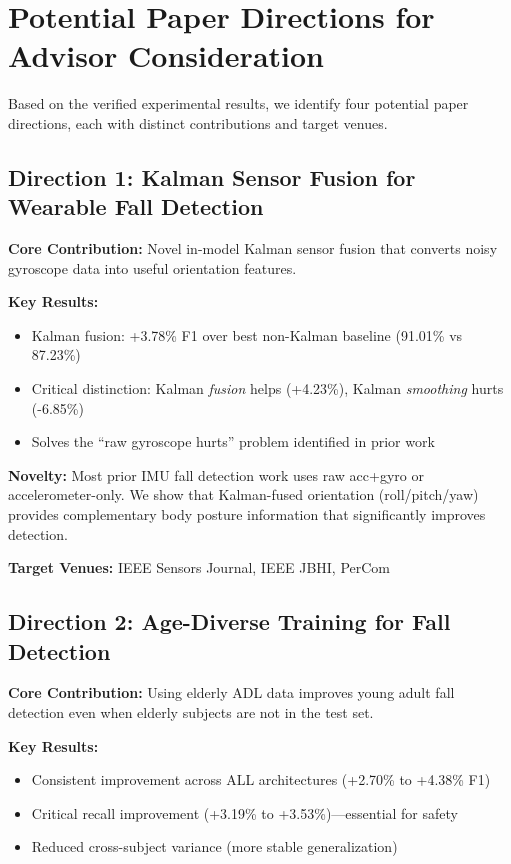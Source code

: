 \documentclass{article}
\begin{document}
\section{Potential Paper Directions for Advisor Consideration}

Based on the verified experimental results, we identify four potential paper directions, each with distinct contributions and target venues.

\subsection{Direction 1: Kalman Sensor Fusion for Wearable Fall Detection}

\textbf{Core Contribution:} Novel in-model Kalman sensor fusion that converts noisy gyroscope data into useful orientation features.

\textbf{Key Results:}
\begin{itemize}
    \item Kalman fusion: +3.78\% F1 over best non-Kalman baseline (91.01\% vs 87.23\%)
    \item Critical distinction: Kalman \textit{fusion} helps (+4.23\%), Kalman \textit{smoothing} hurts (-6.85\%)
    \item Solves the ``raw gyroscope hurts'' problem identified in prior work
\end{itemize}

\textbf{Novelty:} Most prior IMU fall detection work uses raw acc+gyro or accelerometer-only. We show that Kalman-fused orientation (roll/pitch/yaw) provides complementary body posture information that significantly improves detection.

\textbf{Target Venues:} IEEE Sensors Journal, IEEE JBHI, PerCom

\subsection{Direction 2: Age-Diverse Training for Fall Detection}

\textbf{Core Contribution:} Using elderly ADL data improves young adult fall detection even when elderly subjects are not in the test set.

\textbf{Key Results:}
\begin{itemize}
    \item Consistent improvement across ALL architectures (+2.70\% to +4.38\% F1)
    \item Critical recall improvement (+3.19\% to +3.53\%)---essential for safety
    \item Reduced cross-subject variance (more stable generalization)
\end{itemize}
\end{document}
